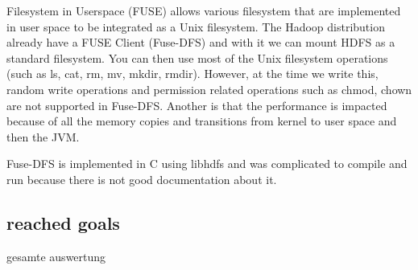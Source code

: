 Filesystem in Userspace (FUSE) allows various filesystem that are implemented in user space to be integrated as a Unix filesystem. The Hadoop distribution already have a FUSE Client (Fuse-DFS) and with it we can mount HDFS as a standard filesystem. You can then use most of the Unix filesystem operations (such as ls, cat, rm, mv, mkdir, rmdir). However, at the time we write this, random write operations and permission related operations such as chmod, chown are not supported in Fuse-DFS. Another is that the performance is impacted because of all the memory copies and transitions from kernel to user space and then the JVM.

Fuse-DFS is implemented in C using libhdfs and was complicated to compile and run because there is not good documentation about it.
\subsection{reached goals}
gesamte auswertung






